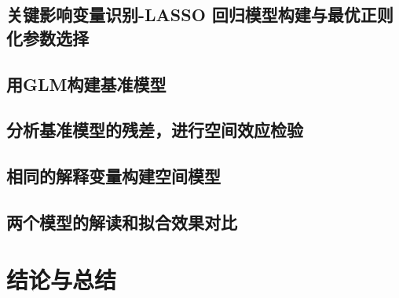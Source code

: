 \documentclass[UTF8]{ctexart}
\begin{document}
\subsection{关键影响变量识别-LASSO 回归模型构建与最优正则化参数选择} 

\subsection{用GLM构建基准模型} 

\subsection{分析基准模型的残差，进行空间效应检验}

\subsection{相同的解释变量构建空间模型}

\subsection{两个模型的解读和拟合效果对比}

\section{结论与总结}
\end{document}
